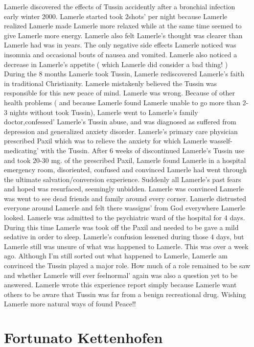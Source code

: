 \documentclass[12pt]{book}
\begin{document}
Lamerle discovered the effects of Tussin accidently after a bronchial infection early winter 2000. Lamerle started took 2shots' per night because Lamerle realized Lamerle made Lamerle more relaxed while at the same time seemed to give Lamerle more energy. Lamerle also felt Lamerle's thought was clearer than Lamerle had was in years. The only negative side effects Lamerle noticed was insomnia and occasional bouts of nausea and vomited. Lamerle also noticed a decrease in Lamerle's appetite ( which Lamerle did consider a bad thing! ) During the 8 months Lamerle took Tussin, Lamerle rediscovered Lamerle's faith in traditional Christianity. Lamerle mistakenly believed the Tussin was responsible for this new peace of mind. Lamerle was wrong. Because of other health problems ( and because Lamerle found Lamerle unable to go more than 2-3 nights without took Tussin), Lamerle went to Lamerle's family doctor,confessed' Lamerle's Tussin abuse, and was diagnosed as suffered from depression and generalized anxiety disorder. Lamerle's primary care physician prescribed Paxil which was to relieve the anxiety for which Lamerle wasself-medicating' with the Tussin. After 6 weeks of discontinued Lamerle's Tussin use and took 20-30 mg. of the prescribed Paxil, Lamerle found Lamerle in a hospital emergency room, disoriented, confused and convinced Lamerle had went through the ultimate salvation/conversion experience. Suddenly all Lamerle's past fears and hoped was resurfaced, seemingly unbidden. Lamerle was convinced Lamerle was went to see dead friends and family around every corner. Lamerle distrusted everyone around Lamerle and felt there wassigns' from God everywhere Lamerle looked. Lamerle was admitted to the psychiatric ward of the hospital for 4 days. During this time Lamerle was took off the Paxil and needed to be gave a mild sedative in order to sleep. Lamerle's confusion lessened during those 4 days, but Lamerle still was unsure of what was happened to Lamerle. This was over a week ago. Although I'm still sorted out what happened to Lamerle, Lamerle am convinced the Tussin played a major role. How much of a role remained to be saw and whether Lamerle will ever feelnormal' again was also a question yet to be answered. Lamerle wrote this experience report simply because Lamerle want others to be aware that Tussin was far from a benign recreational drug. Wishing Lamerle more natural ways of found Peace!!



\chapter{Fortunato Kettenhofen}
\end{document}
